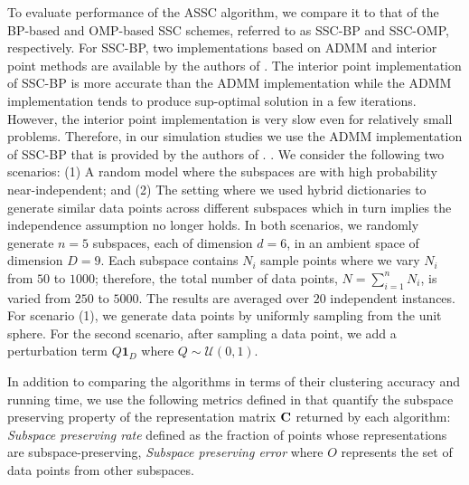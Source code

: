 To evaluate performance of the ASSC algorithm, we compare it to that of the BP-based \cite{elhamifar2009sparse,elhamifar2013sparse} and OMP-based \cite{dyer2013greedy,you2015sparse} SSC schemes, referred to as SSC-BP and SSC-OMP, respectively. For SSC-BP, two implementations based on ADMM and interior point methods are available by the authors of \cite{elhamifar2009sparse,elhamifar2013sparse}. The interior point implementation of SSC-BP is more accurate than the ADMM implementation while the ADMM implementation tends to produce sup-optimal solution in a few iterations. However, the interior point implementation is very slow even for relatively small problems. Therefore, in our simulation studies we use the ADMM implementation of SSC-BP that is provided by the authors of \cite{elhamifar2009sparse,elhamifar2013sparse}. {\color{black}{Our scheme is tested for $L = 1$ and $L=2$}}. We consider the following two scenarios: (1) A random model where the subspaces are with high probability near-independent; and (2) The setting where we used hybrid dictionaries \cite{soussen2013joint} to generate similar data points across different subspaces which in turn implies the independence assumption no longer holds. In both scenarios, we randomly generate $n = 5$ subspaces, each of dimension $d = 6$, in an ambient space of dimension $D = 9$. Each subspace contains $N_i$ sample points  where we vary $N_i$ from $50$ to $1000$; therefore, the total number of data points, $N = \sum_{i=1}^n N_i$, is varied from $250$ to $5000$. The results are averaged over $20$ independent instances. For scenario (1), we generate data points by uniformly sampling from the unit sphere. For the second scenario, after sampling a data point, we add a perturbation term $Q\mathbf{1}_D$ where $Q\sim \mathcal{U}(0,1)$. 

In addition to comparing the algorithms in terms of their clustering accuracy and running time, we use the following metrics defined in \cite{elhamifar2009sparse,elhamifar2013sparse} that quantify the subspace preserving property of the representation matrix ${\mathbf C}$ returned by each algorithm: \textit{Subspace preserving rate} defined as the fraction of points whose representations are  subspace-preserving, \textit{Subspace preserving error} {} where $O$ represents the set of data points from other subspaces.

